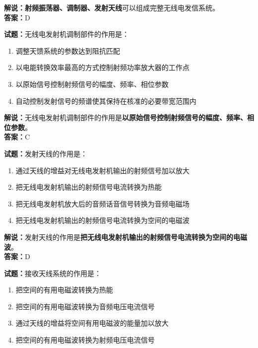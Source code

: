 \documentclass{ctexbook}
\begin{document}
\noindent\textbf{解说：}\textbf{射频振荡器、调制器、发射天线}可以组成完整无线电发信系统。\\\noindent\textbf{答案：}D%

\vspace{\baselineskip}

\noindent\textbf{试题：}无线电发射机调制部件的作用是：

\begin{enumerate}[leftmargin=3em]
  \item 调整天馈系统的参数达到阻抗匹配
  \item 以电能转换效率最高的方式控制射频功率放大器的工作点
  \item 以原始信号控制射频信号的幅度、频率、相位参数
  \item 自动控制发射信号的频谱使其保持在核准的必要带宽范围内
\end{enumerate}

\noindent\textbf{解说：}无线电发射机调制部件的作用是\textbf{以原始信号控制射频信号的幅度、频率、相位参数}。\\\noindent\textbf{答案：}C%

\vspace{\baselineskip}

\noindent\textbf{试题：}发射天线的作用是：

\begin{enumerate}[leftmargin=3em]
  \item 通过天线的增益对无线电发射机输出的射频信号加以放大
  \item 把无线电发射机输出的射频信号电流转换为热能
  \item 把无线电发射机放大后的音频话音信号转换为音频电磁场
  \item 把无线电发射机输出的射频信号电流转换为空间的电磁波
\end{enumerate}

\noindent\textbf{解说：}发射天线的作用是\textbf{把无线电发射机输出的射频信号电流转换为空间的电磁波}。\\
\noindent\textbf{答案：}D

\vspace{\baselineskip}

\noindent\textbf{试题：}接收天线系统的作用是：

\begin{enumerate}[leftmargin=3em]
  \item 把空间的有用电磁波转换为热能
  \item 把空间的有用电磁波转换为音频电压电流信号
  \item 通过天线的增益将空间有用电磁波的能量加以放大
  \item 把空间的有用电磁波转换为射频电压电流信号
\end{enumerate}
\end{document}
